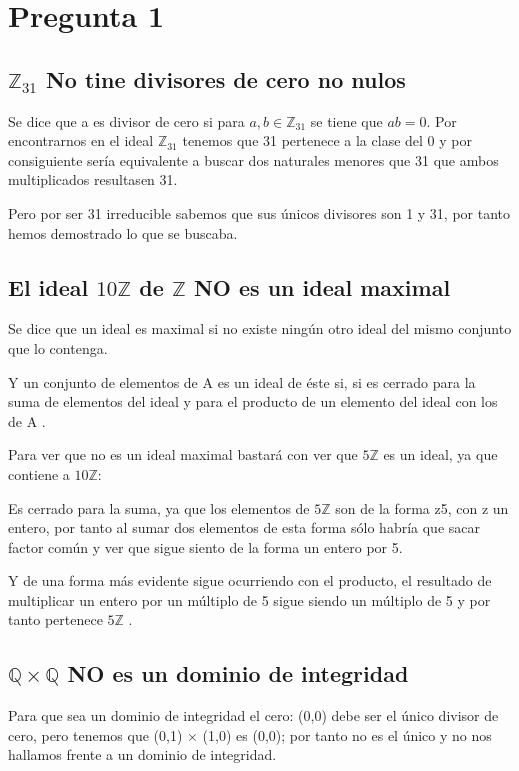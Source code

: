 \documentclass{article}
\theoremstyle{theorem-style}  %
\theoremstyle{definition-style}
\theoremstyle{example-style}
\begin{document}
\makeatletter\renewcommand{\ALG@name}{Algoritmo}

\maketitle
\section{Pregunta 1}
\subsection{$\mathds{Z}_{31}$ No tine divisores de cero no nulos}
Se dice que a es divisor de cero si para $ a,b \in \mathds{Z}_{31}$ se tiene que $ab = 0 $.
Por encontrarnos en el ideal $ \mathds{Z}_{31}$ tenemos que 31 pertenece a la clase del 0 y por consiguiente sería equivalente a buscar dos naturales menores que 31 que ambos multiplicados resultasen 31. 
\par
Pero por ser 31 irreducible sabemos que sus únicos divisores son 1 y 31, por tanto hemos demostrado lo que se buscaba. 

\subsection{ El ideal $10\mathds{Z}$  de $\mathds{Z}$  NO es un ideal maximal}

Se dice que un ideal es maximal si no existe ningún otro ideal del mismo conjunto que lo contenga. 

Y un conjunto de elementos de A es un ideal de éste si, si es cerrado para la suma de elementos del ideal y para el producto de un elemento del ideal con los de A .

Para ver que no es un ideal maximal bastará con ver que $5\mathds{Z}$  es un ideal, ya que contiene a $10\mathds{Z}$:

Es cerrado para la suma, ya que los elementos de $5\mathds{Z}$ son de la forma z5, con z un entero, por tanto al sumar dos elementos de esta forma sólo habría que sacar factor común y ver que sigue siento de la forma un entero por 5. 

Y de una forma más evidente sigue ocurriendo con el producto, el resultado de multiplicar un entero por un múltiplo de 5 sigue siendo un múltiplo de 5 y por tanto pertenece $5\mathds{Z}$ .

\subsection{ $\mathds{Q} \times \mathds{Q}$ NO es un dominio de integridad }  
Para que sea un dominio de integridad el cero: (0,0) debe ser el único divisor de cero, pero tenemos que (0,1) $\times$ (1,0) es (0,0);
por tanto no es el único y no nos hallamos frente a un dominio de integridad. 
\end{document}
